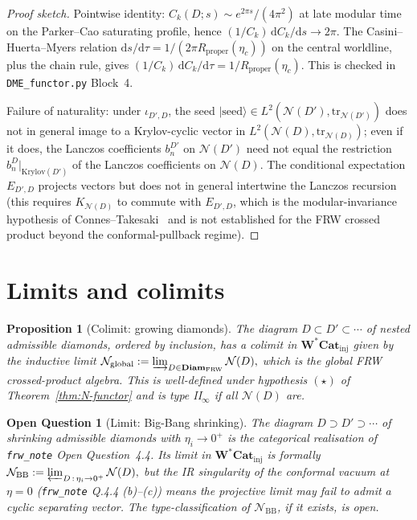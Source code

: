 \documentclass[11pt]{article}
\newtheorem{proposition}[theorem]{Proposition}
\newtheorem{question}[theorem]{Open Question}
\newcommand{\NN}{\mathcal{N}}
\newcommand{\FRW}{{\mathrm{FRW}}}
\newcommand{\Rprop}{R_{\mathrm{proper}}}
\newcommand{\Diam}{\mathbf{Diam}_\FRW}
\newcommand{\WCatinj}{\mathbf{W^{*}\!Cat}_{\mathrm{inj}}}
\begin{document}
\begin{proof}[Proof sketch]
Pointwise identity: $C_k(D;s)\sim e^{2\pi s}/(4\pi^2)$ at late
modular time on the Parker--Cao saturating profile, hence
$(1/C_k)\,\mathrm{d}C_k/\mathrm{d}s\to 2\pi$. The
Casini--Huerta--Myers relation $\mathrm{d}s/\mathrm{d}\tau=1/(2\pi
\Rprop(\eta_c))$ on the central worldline, plus the chain rule,
gives $(1/C_k)\,\mathrm{d}C_k/\mathrm{d}\tau=1/\Rprop(\eta_c)$.
This is checked in \texttt{DME\_functor.py} Block~4.

Failure of naturality: under $\iota_{D',D}$, the seed
$|\mathrm{seed}\rangle\in L^2(\NN(D'),\mathrm{tr}_{\NN(D')})$
does not in general image to a Krylov-cyclic vector in
$L^2(\NN(D),\mathrm{tr}_{\NN(D)})$; even if it does, the Lanczos
coefficients $b_n^{D'}$ on $\NN(D')$ need not equal the
restriction $b_n^D|_{\mathrm{Krylov}(D')}$ of the Lanczos
coefficients on $\NN(D)$. The conditional expectation
$E_{D',D}$ projects vectors but does not in general intertwine
the Lanczos recursion (this requires $K_{\NN(D)}$ to commute with
$E_{D',D}$, which is the modular-invariance hypothesis of
Connes--Takesaki~\cite{ConnesTakesaki1977} and is not
established for the FRW crossed product beyond the
conformal-pullback regime).
\end{proof}

\section{Limits and colimits}\label{sec:limits}

\begin{proposition}[Colimit: growing diamonds]\label{prop:colim}
The diagram $D\subset D'\subset\cdots$ of nested admissible
diamonds, ordered by inclusion, has a colimit in $\WCatinj$
given by the inductive limit
\(
\NN_{\mathrm{global}} := \varinjlim_{D\in\Diam}\NN(D),
\)
which is the global FRW crossed-product algebra. This is well-defined
under hypothesis $(\star)$ of Theorem~\ref{thm:N-functor} and is
type II$_\infty$ if all $\NN(D)$ are.
\end{proposition}

\begin{question}[Limit: Big-Bang shrinking]\label{q:limit-BB}
The diagram $D\supset D'\supset\cdots$ of shrinking admissible
diamonds with $\eta_i\to 0^+$ is the categorical realisation of
\texttt{frw\_note} Open Question~4.4. Its limit in $\WCatinj$ is
formally
\(
\NN_{\mathrm{BB}} := \varprojlim_{D\,:\,\eta_i\to 0^+}\NN(D),
\)
but the IR singularity of the conformal vacuum at $\eta=0$
(\texttt{frw\_note} Q.4.4 (b)--(c)) means the projective limit may
fail to admit a cyclic separating vector. The type-classification of
$\NN_{\mathrm{BB}}$, if it exists, is open.
\end{question}
\end{document}
